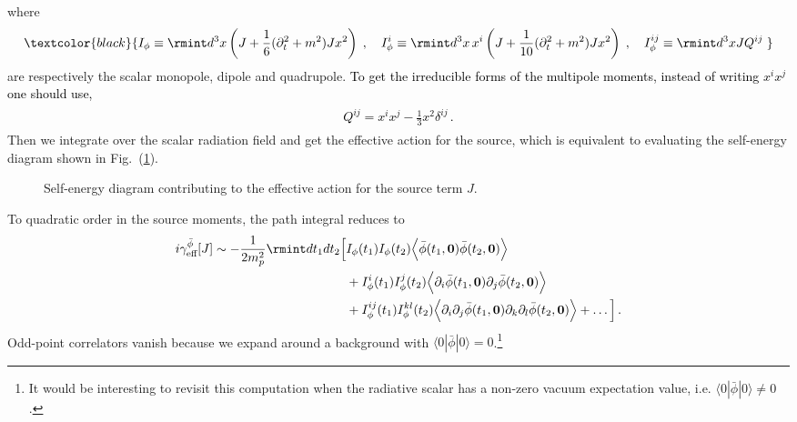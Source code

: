 where 
\begin{equation}
\label{5.12mn}
\textcolor{black}{I_\phi  \equiv  \rmint d^3 x \left( J + \frac{1}{6}  (\partial_t^2+m^2) J  x^2 \right) \;, \quad I_\phi^i  \equiv \rmint d^3x \, x^i \left(J + \frac{1}{10} (\partial_t^2+m^2) J x^2 \right) \;, \quad  I_\phi^{ij} \equiv \rmint d^3x J  Q^{ij} \;}
\end{equation}
are respectively the scalar monopole, dipole and quadrupole.
\textcolor{black}{ To get the irreducible forms of the multipole moments, instead of writing $x^ix^j$ one should use,
\begin{align}
    \begin{split}
        {Q}^{ij}=x^ix^j-\frac{1}{3}x^2\delta^{ij}\,.
    \end{split}
\end{align}}
Then we integrate over the scalar radiation field and get the effective action for the source, which is equivalent to evaluating the self-energy diagram shown in Fig.~(\ref{mfig12}).
\begin{figure}
    \centering
{}
    \caption{Self-energy diagram contributing to the effective action for the source term $J$.}
    \label{mfig12}
\end{figure}
To quadratic order in the source moments, the path integral reduces to
\begin{align}
\begin{split}
i\gamma_{\text{eff}}^{\bar\phi}[J]\sim -\frac{1}{2m_p^2}\rmint dt_1 dt_2 \Big[&
I_{\phi}(t_1)I_{\phi}(t_2)\Big\langle\Bar{\phi}(t_1,\boldsymbol{0})\Bar{\phi}(t_2,\boldsymbol{0})\Big\rangle\\ &
+I_{\phi}^{i}(t_1)I_{\phi}^{j}(t_2)\Big\langle\partial_{i}\Bar{\phi}(t_1,\boldsymbol{0})\partial_{j}\Bar{\phi}(t_2,\boldsymbol{0})\Big\rangle\\ &
+I_{\phi}^{ij}(t_1)I_{\phi}^{kl}(t_2)\Big\langle\partial_{i}\partial_{j}\Bar{\phi}(t_1,\boldsymbol{0})\partial_{k}\partial_{l}\Bar{\phi}(t_2,\boldsymbol{0})\Big\rangle+\ldots\Big]\,.
\label{5.14n}
\end{split}
\end{align}
Odd-point correlators vanish because we expand around a background with $\langle 0 |\bar\phi|0\rangle=0$.\footnote{It would be interesting to revisit this computation when the radiative scalar has a non-zero vacuum expectation value, i.e. $\langle 0 |\bar\phi|0\rangle\ne 0$.}
